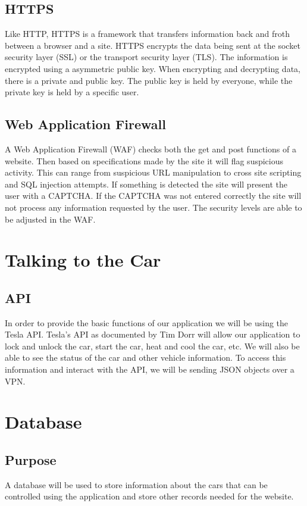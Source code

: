 \documentclass[onecolumn, draftclsnofoot,10pt, compsoc]{IEEEtran}
\begin{document}
    \subsection{HTTPS}
    Like HTTP, HTTPS is a framework that transfers information back and froth between a browser and a site. HTTPS encrypts the data being sent at the socket security layer (SSL) or the transport security layer (TLS). The information is encrypted using a asymmetric public key. When encrypting and decrypting data, there is a private and public key. The public key is held by everyone, while the private key is held by a specific user.\cite{HTTPS} 
    \subsection{Web Application Firewall}
    A Web Application Firewall (WAF) checks both the get and post functions of a website. Then based on specifications made by the site it will flag suspicious activity. This can range from suspicious URL manipulation to cross site scripting and SQL injection attempts. If something is detected the site will present the user with a CAPTCHA. If the CAPTCHA was not entered correctly the site will not process any information requested by the user. The security levels are able to be adjusted in the WAF.\cite{WAF}
\section{Talking to the Car}
    \subsection{API}
    In order to provide the basic functions of our application we will be using the Tesla API. Tesla's API as documented by Tim Dorr will allow our application to lock and unlock the car, start the car, heat and cool the car, etc. We will also be able to see the status of the car and other vehicle information. To access this information and interact with the API, we will be sending JSON objects over a VPN. \cite{API}
\section{Database}

    \subsection{Purpose}
    
        A database will be used to store information about the cars that can be controlled using the application and store other records needed for the website.
        
\end{document}
